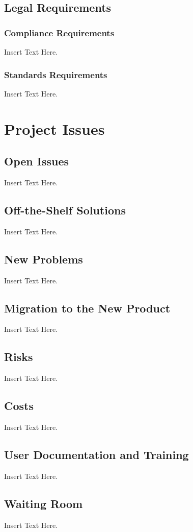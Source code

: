 \documentclass [12pt]{article}
\begin{document}
\subsection{Legal Requirements}
\subsubsection{Compliance Requirements }
		Insert Text Here.
\subsubsection{Standards Requirements }
		Insert Text Here.





\section {Project Issues} 


\subsection{Open Issues}
	Insert Text Here.

\subsection{Off-the-Shelf Solutions}
	Insert Text Here.

\subsection{New Problems}
	Insert Text Here.

\subsection{Migration to the New Product} 
	Insert Text Here.

\subsection{Risks}
	Insert Text Here.
	
\subsection{Costs}	
	Insert Text Here.

\subsection{User Documentation and Training}
	Insert Text Here.

\subsection{Waiting Room}
	Insert Text Here. 
\end{document}
